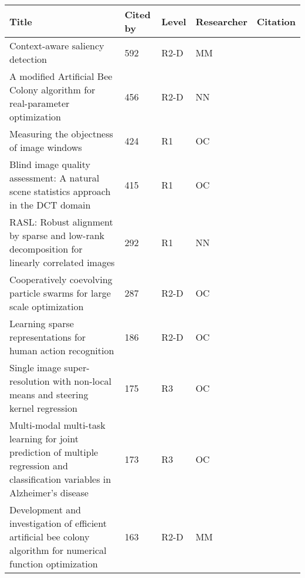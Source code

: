 \begin{tabularx}{\textwidth}{Xllll}
\toprule
                                                                                                                           Title &  Cited by & Level & Researcher &                      Citation \\
\midrule
 Context-aware saliency detection &  592 &  R2-D &  MM &  {\cite{goferman2012context}} \\
 A modified Artificial Bee Colony algorithm for real-parameter optimization &  456 &  R2-D &  NN &  {\cite{akay2012modified}} \\
 Measuring the objectness of image windows &  424 &  R1 &  OC &  {\cite{alexe2012measuring}} \\
 Blind image quality assessment: A natural scene statistics approach in the DCT domain &  415 &  R1 &  OC &  {\cite{saad2012blindimage}} \\
 RASL: Robust alignment by sparse and low-rank decomposition for linearly correlated images &  292 &  R1 &  NN &  {\cite{peng2012rasl}} \\
 Cooperatively coevolving particle swarms for large scale optimization &  287 &  R2-D &  OC &  {\cite{li2012cooperatively}} \\
 Learning sparse representations for human action recognition &  186 &  R2-D &  OC &  {\cite{guha2012learning}} \\
 Single image super-resolution with non-local means and steering kernel regression &  175 &  R3 &  OC &  {\cite{zhang2012single}} \\
 Multi-modal multi-task learning for joint prediction of multiple regression and classification variables in Alzheimer's disease &  173 &  R3 &  OC &  {\cite{zhang2012multi}} \\
 Development and investigation of efficient artificial bee colony algorithm for numerical function optimization &  163 &  R2-D &  MM &  {\cite{li2012development}} \\
\bottomrule
\end{tabularx}
